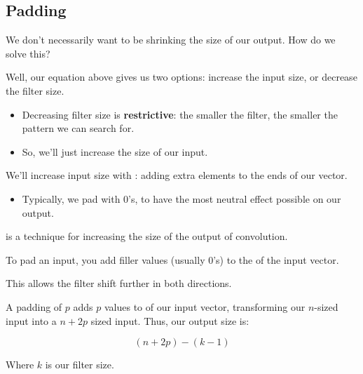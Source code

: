     \subsection{Padding}

        We don't necessarily want to be shrinking the size of our output. How do we solve this?

        Well, our equation above gives us two options: increase the input size, or decrease the filter size.

        \begin{itemize}
            \item Decreasing filter size is \textbf{restrictive}: the smaller the filter, the smaller the pattern we can search for.
            \item So, we'll just increase the size of our input.
        \end{itemize}

        We'll increase input size with : adding extra elements to the ends of our vector.

        \begin{itemize}
            \item Typically, we pad with 0's, to have the most neutral effect possible on our output.\\
        \end{itemize}
        
        

        \begin{definition}
             is a technique for increasing the size of the output of convolution.

            To pad an input, you add filler values (usually 0's) to the  of the input vector.

            This allows the filter shift further in both directions.

            \subsecdiv

            A padding of $p$ adds $p$ values to  of our input vector, transforming our $n$-sized input into a $n+2p$ sized input. Thus, our output size is:

            \begin{equation*}
                (n+2p) - (k-1)
            \end{equation*}

            Where $k$ is our filter size.
        \end{definition}

